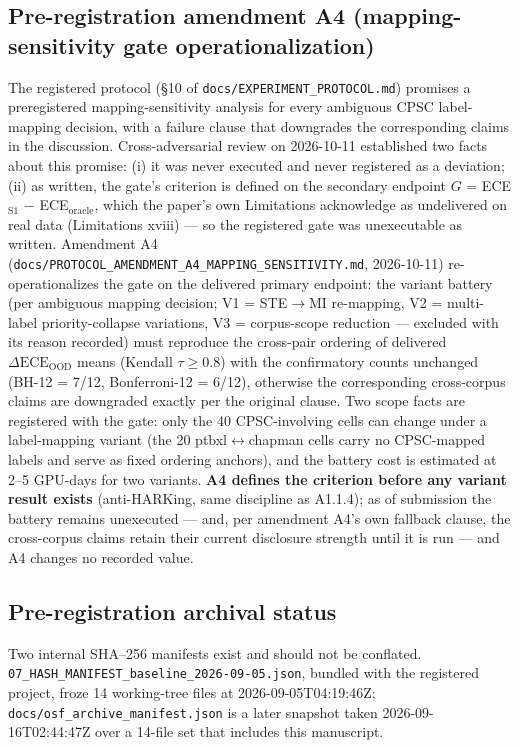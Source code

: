 \documentclass[final,5p,times,nonatbib]{elsarticle}
\begin{document}
\subsection{Pre-registration amendment A4 (mapping-sensitivity gate operationalization)}
\label{sec:a4}
The registered protocol (\S10 of
\texttt{docs/EXPERIMENT\_PROTOCOL.md}) promises a preregistered
mapping-sensitivity analysis for every ambiguous CPSC label-mapping
decision, with a failure clause that downgrades the corresponding
claims in the discussion. Cross-adversarial review on 2026-10-11
established two facts about this promise: (i) it was never executed and
never registered as a deviation; (ii) as written, the gate's criterion
is defined on the secondary endpoint $G$ = ECE$_{\text{S1}}$ $-$
ECE$_{\text{oracle}}$, which the paper's own Limitations acknowledge as
undelivered on real data (Limitations xviii) --- so the registered gate
was unexecutable as written. Amendment A4
(\texttt{docs/PROTOCOL\_AMENDMENT\_A4\_}\allowbreak\texttt{MAPPING\_SENSITIVITY.md},
2026-10-11) re-operationalizes the gate on the delivered primary
endpoint: the variant battery (per ambiguous mapping decision;
V1 = STE$\rightarrow$MI re-mapping, V2 = multi-label priority-collapse
variations, V3 = corpus-scope reduction --- excluded with its reason
recorded) must reproduce the cross-pair ordering of delivered
$\Delta\text{ECE}_{\text{OOD}}$ means (Kendall $\tau \geq 0.8$) with the
confirmatory counts unchanged (BH-12 = 7/12, Bonferroni-12 = 6/12),
otherwise the corresponding cross-corpus claims are downgraded exactly
per the original clause. Two scope facts are registered with the gate:
only the 40 CPSC-involving cells can change under a label-mapping
variant (the 20 ptbxl$\leftrightarrow$chapman cells carry no CPSC-mapped
labels and serve as fixed ordering anchors), and the battery cost is
estimated at 2--5 GPU-days for two variants. \textbf{A4 defines the
criterion before any variant result exists} (anti-HARKing, same
discipline as A1.1.4); as of submission the battery remains
unexecuted --- and, per amendment A4's own fallback clause, the
cross-corpus claims retain their current disclosure strength until it
is run --- and A4 changes no recorded value.

\subsection{Pre-registration archival status}
\label{sec:archival-status}
Two internal SHA--256 manifests exist and should not be conflated.
\texttt{07\_HASH\_MANIFEST\_baseline\_2026-09-05.json}, bundled with the
registered project, froze 14 working-tree files at
2026-09-05T04:19:46Z; \texttt{docs/osf\_archive\_manifest.json} is a later
snapshot taken 2026-09-16T02:44:47Z over a 14-file set that includes this
manuscript.
\end{document}
